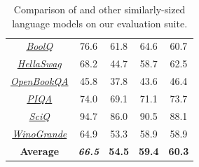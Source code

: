 \begin{table}[h!]
\begin{tabular}{c@{}c@{}c@{}c@{}c}
    {\textit{\hyperlink{cite.clark2019boolq}{BoolQ}}} & 76.6 & 61.8 & 64.6 & {\color{VarnishBravoThree}60.7} \\
    {\textit{\hyperlink{cite.zellers2019hellaswag}{HellaSwag}}} & 68.2 & 44.7 & 58.7 & {\color{VarnishBravoThree}62.5} \\
    {\textit{\hyperlink{cite.openbookqa}{OpenBookQA}}} & 45.8 & 37.8 & 43.6 & {\color{VarnishBravoThree}46.4} \\
    {\textit{\hyperlink{cite.piqa}{PIQA}}} & 74.0 & 69.1 & 71.1 & {\color{VarnishBravoThree}73.7} \\
    {\textit{\hyperlink{cite.sciq}{SciQ}}} & 94.7 & 86.0 & 90.5 & {\color{VarnishBravoThree}88.1} \\
    {\textit{\hyperlink{cite.winogrande}{WinoGrande}}} & 64.9 & 53.3 & 58.9 & {\color{VarnishBravoThree}58.9} \\
    \midrule
    \textbf{Average} & \textbf{\textit{66.5}} & \textbf{54.5} & \textbf{59.4} & {\color{VarnishBravoThree}\textbf{60.3}} \\
    \bottomrule
    \end{tabular}
    \vspace{1em}
    \caption{
        Comparison of \OlmoTiny and other similarly-sized language models on our evaluation suite. 
    }
    \label{table:1b-eval}
\end{table}
